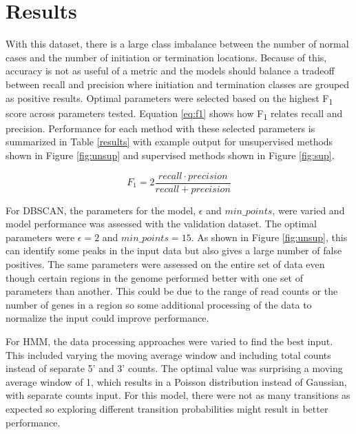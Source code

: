 \documentclass{article}
\begin{document}
\section{Results}
With this dataset, there is a large class imbalance between the number of normal cases and the number of initiation or termination locations.  Because of this, accuracy is not as useful of a metric and the models should balance a tradeoff between recall and precision where initiation and termination classes are grouped as positive results.  Optimal parameters were selected based on the highest F\textsubscript{1} score across parameters tested.  Equation \ref{eq:f1} shows how F\textsubscript{1} relates recall and precision.  Performance for each method with these selected parameters is summarized in Table \ref{results} with example output for unsupervised methods shown in Figure \ref{fig:unsup} and supervised methods shown in Figure \ref{fig:sup}.

\begin{equation}
    \label{eq:f1}
    F_1 = 2\frac{recall \cdot precision}{recall + precision}
\end{equation}

For DBSCAN, the parameters for the model, $\epsilon$ and $min\_points$, were varied and model performance was assessed with the validation dataset.  The optimal parameters were $\epsilon = 2$ and $min\_points=15$.  As shown in Figure \ref{fig:unsup}, this can identify some peaks in the input data but also gives a large number of false positives.  The same parameters were assessed on the entire set of data even though certain regions in the genome performed better with one set of parameters than another.  This could be due to the range of read counts or the number of genes in a region so some additional processing of the data to normalize the input could improve performance.

For HMM, the data processing approaches were varied to find the best input. This included varying the moving average window and including total counts instead of separate 5' and 3' counts.  The optimal value was surprising a moving average window of 1, which results in a Poisson distribution instead of Gaussian, with separate counts input.  For this model, there were not as many transitions as expected so exploring different transition probabilities might result in better performance.
\end{document}
